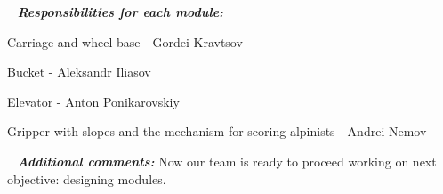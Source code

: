    \newline
  \textit{\textbf{Responsibilities for each module:}}
  \begin{enumerate*}
  	\item Carriage and wheel base - Gordei Kravtsov
  	
  	\item Bucket - Aleksandr Iliasov
  	
  	\item Elevator - Anton Ponikarovskiy
  	
  	\item Gripper with slopes and the mechanism for scoring alpinists - Andrei Nemov
  	
  \end{enumerate*}
  
   \newline
  \textit{\textbf{Additional comments:}} Now our team is ready to proceed working on next objective: designing modules.

\fillpage
